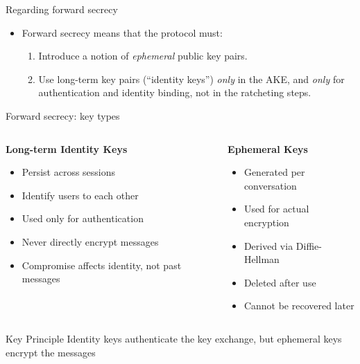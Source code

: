 \documentclass[aspectratio=169, lualatex, handout]{beamer}
\begin{document}
\begin{frame}{Regarding forward secrecy}
	\begin{itemize}
		\item Forward secrecy means that the protocol must:
		      \begin{enumerate}
			      \item Introduce a notion of \textit{ephemeral} public key pairs.
			      \item Use long-term key pairs (``identity keys'') \textit{only} in the AKE, and \textit{only} for authentication and identity binding, not in the ratcheting steps.
		      \end{enumerate}
	\end{itemize}
\end{frame}

\begin{frame}{Forward secrecy: key types}
	\begin{columns}
		\begin{column}{0.5\textwidth}
			\textbf{Long-term Identity Keys}
			\begin{itemize}
				\item Persist across sessions
				\item Identify users to each other
				\item Used only for authentication
				\item Never directly encrypt messages
				\item Compromise affects identity, not past messages
			\end{itemize}
		\end{column}
		\begin{column}{0.5\textwidth}
			\textbf{Ephemeral Keys}
			\begin{itemize}
				\item Generated per conversation
				\item Used for actual encryption
				\item Derived via Diffie-Hellman
				\item Deleted after use
				\item Cannot be recovered later
			\end{itemize}
		\end{column}
	\end{columns}
	\begin{alertblock}{Key Principle}
		Identity keys authenticate the key exchange, but ephemeral keys encrypt the messages
	\end{alertblock}
\end{frame}
\end{document}
